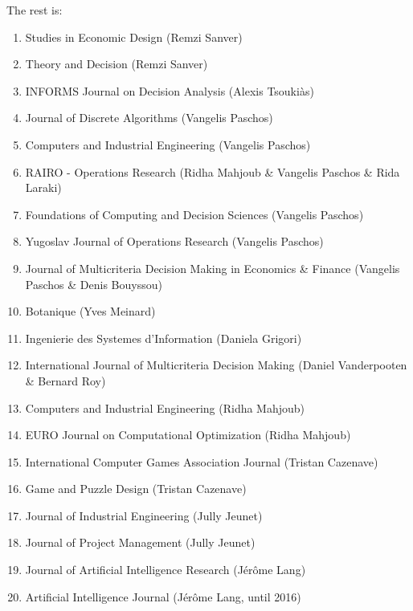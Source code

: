 \documentclass[version=last, pagesize, twoside=semi, DIV=calc, 12pt, a4paper, french, english, bibliography=totoc]{scrartcl}
\begin{document}
The rest is:   
\begin{enumerate}
\item Studies in Economic Design  (Remzi Sanver)
\item Theory and Decision (Remzi Sanver)
\item INFORMS Journal on Decision Analysis (Alexis Tsouki\`as)
\item Journal of Discrete Algorithms  (Vangelis Paschos)
\item Computers and Industrial Engineering  (Vangelis Paschos)
\item  RAIRO - Operations Research  (Ridha Mahjoub \& Vangelis Paschos \& Rida Laraki)
\item  Foundations of Computing and Decision Sciences  (Vangelis Paschos)
\item Yugoslav Journal of Operations Research   (Vangelis Paschos) 
\item Journal of Multicriteria Decision Making in Economics \& Finance  (Vangelis Paschos \& Denis Bouyssou)
\item  Botanique (Yves Meinard)
\item Ingenierie des Systemes d'Information (Daniela Grigori)
\item International Journal of Multicriteria Decision Making (Daniel Vanderpooten \& Bernard Roy)
\item Computers and Industrial Engineering (Ridha Mahjoub)
\item EURO Journal on Computational Optimization (Ridha Mahjoub)
\item International Computer Games Association Journal (Tristan Cazenave)
\item  Game and Puzzle Design  (Tristan Cazenave)
\item Journal of Industrial Engineering (Jully Jeunet)
\item Journal of Project Management  (Jully Jeunet)
\item Journal of Artificial Intelligence Research (J\'er\^ome Lang)
\item Artificial Intelligence Journal (J\'er\^ome Lang, until 2016)

\end{enumerate}
\end{document}
